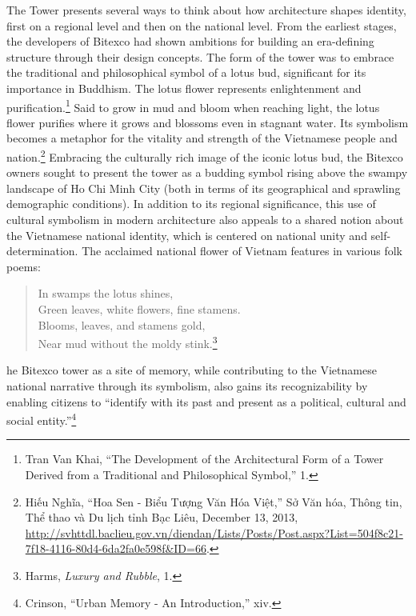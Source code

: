 \vi The Tower presents several ways to think about how architecture shapes identity, first on a regional level and then on the national level. From the earliest stages, the developers of Bitexco had shown ambitions for building an era-defining structure through their design concepts. The form of the tower was to embrace the traditional and philosophical symbol of a lotus bud, significant for its importance in Buddhism. The lotus flower represents enlightenment and purification.\footnote{Tran Van Khai, “The Development of the Architectural Form of a Tower Derived from a Traditional and Philosophical Symbol,” 1.} Said to grow in mud and bloom when reaching light, the lotus flower purifies where it grows and blossoms even in stagnant water. Its symbolism becomes a metaphor for the vitality and strength of the Vietnamese people and nation.\footnote{Hiếu Nghĩa, “Hoa Sen - Biểu Tượng Văn Hóa Việt,” Sở Văn hóa, Thông tin, Thể thao và Du lịch tỉnh Bạc Liêu, December 13, 2013, \url{http://svhttdl.baclieu.gov.vn/diendan/Lists/Posts/Post.aspx?List=504f8c21-7f18-4116-80d4-6da2fa0e598f&ID=66}.} Embracing the culturally rich image of the iconic lotus bud, the Bitexco owners sought to present the tower as a budding symbol rising above the swampy landscape of Ho Chi Minh City (both in terms of its geographical and sprawling demographic conditions). In addition to its regional significance, this use of cultural symbolism in modern architecture also appeals to a shared notion about the Vietnamese national identity, which is centered on national unity and self-determination. The acclaimed national flower of Vietnam features in various folk poems:
\begin{verse}
\begin{center}
\hspace{1.3em} In swamps the lotus shines, \\
Green leaves, white flowers, fine stamens.\\
\hspace{2em} Blooms, leaves, and stamens gold,\\
Near mud without the moldy stink.\footnote{Harms, \textit{Luxury and Rubble}, 1.}
\end{center}
\end{verse}
he Bitexco tower as a site of memory, while contributing to the Vietnamese national narrative through its symbolism, also gains its recognizability by enabling citizens to “identify with its past and present as a political, cultural and social entity.”\footnote{Crinson, “Urban Memory - An Introduction,” xiv.}

